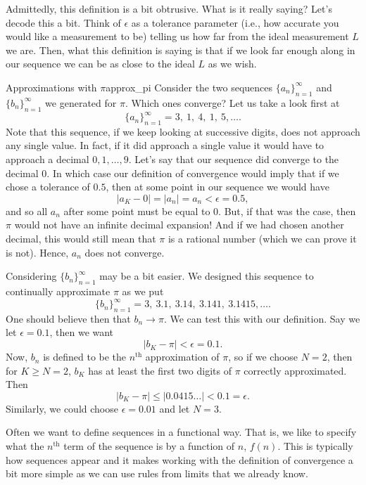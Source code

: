 Admittedly, this definition is a bit obtrusive.  What is it really saying?  Let's decode this a bit. Think of $\epsilon$ as a tolerance parameter (i.e., how accurate you would like a measurement to be) telling us how far from the ideal measurement $L$ we are. Then, what this definition is saying is that if we look far enough along in our sequence we can be as close to the ideal $L$ as we wish.

\begin{ex}{Approximations with $\pi$}{approx_pi}
Consider the two sequences $\{a_n\}_{n=1}^\infty$ and $\{b_n\}_{n=1}^\infty$ we generated for $\pi$.  Which ones converge? Let us take a look first at
\[
\{a_n\}_{n=1}^\infty = 3,~1,~4,~1,~5, \dots.
\]
Note that this sequence, if we keep looking at successive digits, does not approach any single value.  In fact, if it did approach a single value it would have to approach a decimal $0,1,\dots, 9$.  Let's say that our sequence did converge to the decimal $0$. In which case our definition of convergence would imply that if we chose a tolerance of $0.5$, then at some point in our sequence we would have
\[
|a_K - 0|=|a_n|=a_n<\epsilon=0.5,
\]
and so all $a_n$ after some point must be equal to $0$.  But, if that was the case, then $\pi$ would not have an infinite decimal expansion! And if we had chosen another decimal, this would still mean that $\pi$ is a rational number (which we can prove it is not). Hence, $a_n$ does not converge.

Considering $\{b_n\}_{n=1}^\infty$ may be a bit easier.  We designed this sequence to continually approximate $\pi$ as we put
\[
\{b_n\}_{n=1}^\infty = 3,~3.1, ~ 3.14, ~ 3.141, ~ 3.1415, \dots.
\]
One should believe then that $b_n\to \pi$.  We can test this with our definition.  Say we let $\epsilon = 0.1$, then we want
\[
|b_K-\pi|<\epsilon = 0.1.
\]
Now, $b_n$ is defined to be the $n^\textrm{th}$ approximation of $\pi$, so if we choose $N=2$, then for $K\geq N=2$, $b_K$ has at least the first two digits of $\pi$ correctly approximated.  Then
\[
|b_K - \pi| \leq |0.0415\dots | < 0.1 = \epsilon.
\]
Similarly, we could choose $\epsilon = 0.01$ and let $N=3$.
\end{ex}

Often we want to define sequences in a functional way.  That is, we like to specify what the $n^\textrm{th}$ term of the sequence is by a function of $n$, $f(n)$. This is typically how sequences appear and it makes working with the definition of convergence a bit more simple as we can use rules from limits that we already know.

